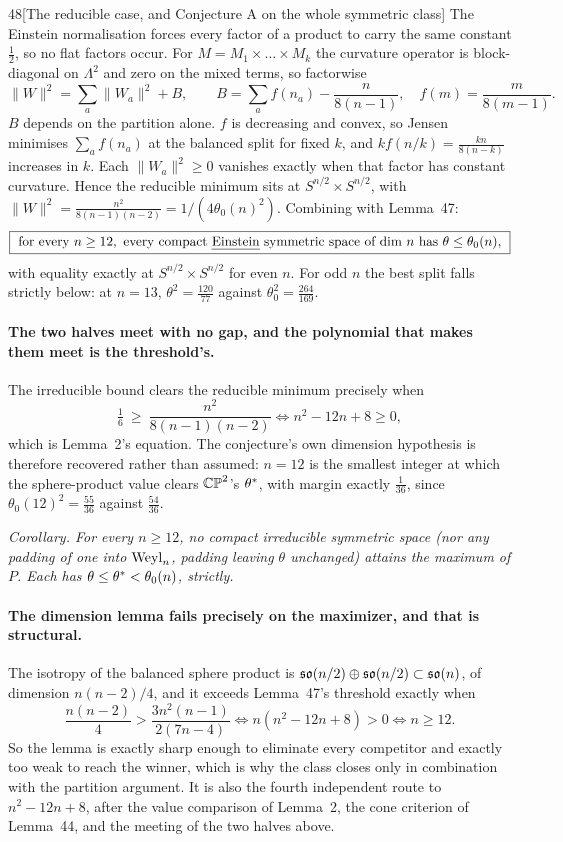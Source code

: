 \begin{Lem}{48}[The reducible case, and Conjecture A on the whole symmetric class]
The Einstein normalisation forces every factor of a product to carry the same constant $\tfrac12$, so no flat factors occur. For $M=M_1\times\dots\times M_k$ the curvature operator is block-diagonal on $\Lambda^2$ and zero on the mixed terms, so factorwise
\[
\|W\|^2=\sum_a\|W_a\|^2+B,\qquad B=\sum_af(n_a)-\frac n{8(n-1)},\quad f(m)=\frac m{8(m-1)} .
\]
$B$ depends on the partition alone. $f$ is decreasing and convex, so Jensen minimises $\sum_af(n_a)$ at the balanced split for fixed $k$, and $k f(n/k)=\tfrac{kn}{8(n-k)}$ increases in $k$. Each $\|W_a\|^2\ge0$ vanishes exactly when that factor has constant curvature. Hence the reducible minimum sits at $S^{n/2}\times S^{n/2}$, with $\|W\|^2=\tfrac{n^2}{8(n-1)(n-2)}=1/(4\theta_0(n)^2)$. Combining with Lemma~47:
\[
\boxed{\ \text{for every }n\ge12,\ \text{every compact \emph{Einstein} symmetric space of dim }n\text{ has }\theta\le\theta_0(n),\ }
\]
with equality exactly at $S^{n/2}\times S^{n/2}$ for even $n$. For odd $n$ the best split falls strictly below: at $n=13$, $\theta^2=\tfrac{120}{77}$ against $\theta_0^2=\tfrac{264}{169}$.
\end{Lem}

\paragraph{The two halves meet with no gap, and the polynomial that makes them meet is the threshold's.} The irreducible bound clears the reducible minimum precisely when
\[
\tfrac16\ \ge\ \frac{n^2}{8(n-1)(n-2)}\iff n^2-12n+8\ge0 ,
\]
which is Lemma~2's equation. The conjecture's own dimension hypothesis is therefore recovered rather than assumed: $n=12$ is the smallest integer at which the sphere-product value clears $\mathbb{CP}^2$'s $\theta^{*}$, with margin exactly $\tfrac1{36}$, since $\theta_0(12)^2=\tfrac{55}{36}$ against $\tfrac{54}{36}$.

\begin{center}\itshape
Corollary. For every $n\ge12$, no compact irreducible symmetric space (nor any padding of one into $\mathrm{Weyl}_n$, padding leaving $\theta$ unchanged) attains the maximum of $P$. Each has $\theta\le\theta^{*}<\theta_0(n)$, strictly.
\end{center}

\paragraph{The dimension lemma fails precisely on the maximizer, and that is structural.} The isotropy of the balanced sphere product is $\mathfrak{so}(n/2)\oplus\mathfrak{so}(n/2)\subset\mathfrak{so}(n)$, of dimension $n(n-2)/4$, and it exceeds Lemma~47's threshold exactly when
\[
\frac{n(n-2)}4>\frac{3n^2(n-1)}{2(7n-4)}\iff n(n^2-12n+8)>0\iff n\ge12 .
\]
So the lemma is exactly sharp enough to eliminate every competitor and exactly too weak to reach the winner, which is why the class closes only in combination with the partition argument. It is also the fourth independent route to $n^2-12n+8$, after the value comparison of Lemma~2, the cone criterion of Lemma~44, and the meeting of the two halves above.

